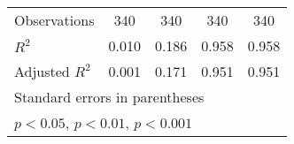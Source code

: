 {\begin{tabular}{l*{4}{c}}
\hline
Observations        &         340         &         340         &         340         &         340         \\
\(R^{2}\)           &       0.010         &       0.186         &       0.958         &       0.958         \\
Adjusted \(R^{2}\)  &       0.001         &       0.171         &       0.951         &       0.951         \\
\hline\hline
\multicolumn{5}{l}{\footnotesize Standard errors in parentheses}\\
\multicolumn{5}{l}{\footnotesize \sym{*} \(p<0.05\), \sym{**} \(p<0.01\), \sym{***} \(p<0.001\)}\\
\end{tabular}
}
